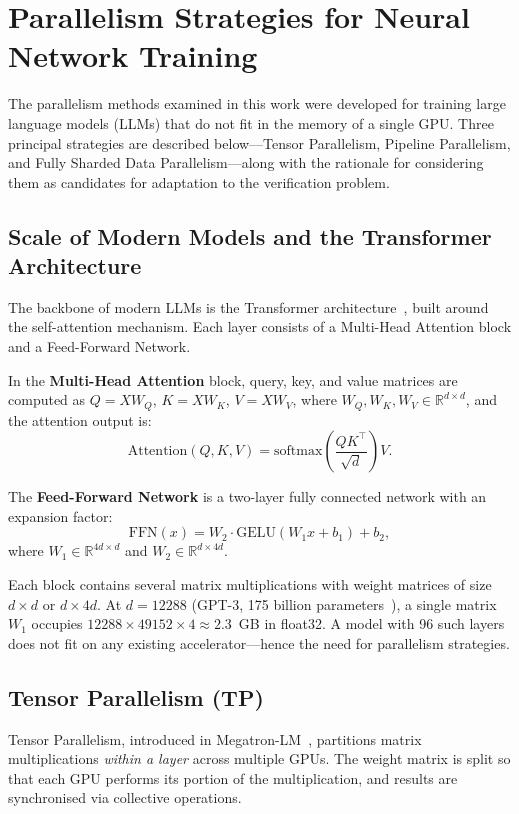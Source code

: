 \section{Parallelism Strategies for Neural Network Training}

The parallelism methods examined in this work were developed for training large
language models (LLMs) that do not fit in the memory of a single GPU. Three
principal strategies are described below---Tensor Parallelism, Pipeline
Parallelism, and Fully Sharded Data Parallelism---along with the rationale for
considering them as candidates for adaptation to the verification problem.

\subsection{Scale of Modern Models and the Transformer Architecture}

The backbone of modern LLMs is the Transformer architecture~\cite{Vaswani2017Attention},
built around the self-attention mechanism. Each layer consists of a
Multi-Head Attention block and a Feed-Forward Network.

In the \textbf{Multi-Head Attention} block, query, key, and value matrices are
computed as $Q = XW_Q$, $K = XW_K$, $V = XW_V$, where
$W_Q, W_K, W_V \in \mathbb{R}^{d \times d}$, and the attention output is:
$$\mathrm{Attention}(Q, K, V) = \mathrm{softmax}\!\left(\frac{QK^\top}{\sqrt{d}}\right)V.$$

The \textbf{Feed-Forward Network} is a two-layer fully connected network with
an expansion factor:
$$\mathrm{FFN}(x) = W_2 \cdot \mathrm{GELU}(W_1 x + b_1) + b_2,$$
where $W_1 \in \mathbb{R}^{4d \times d}$ and $W_2 \in \mathbb{R}^{d \times 4d}$.

Each block contains several matrix multiplications with weight matrices of
size $d \times d$ or $d \times 4d$. At $d = 12288$ (GPT-3, 175 billion
parameters~\cite{GPT3Brown2020}), a single matrix $W_1$ occupies
$12288 \times 49152 \times 4 \approx 2.3$~GB in float32. A model with
96 such layers does not fit on any existing accelerator---hence the need
for parallelism strategies.

\subsection{Tensor Parallelism (TP)}

Tensor Parallelism, introduced in Megatron-LM~\cite{MegatronLM2020},
partitions matrix multiplications \textit{within a layer} across multiple GPUs.
The weight matrix is split so that each GPU performs its portion of the
multiplication, and results are synchronised via collective operations.

